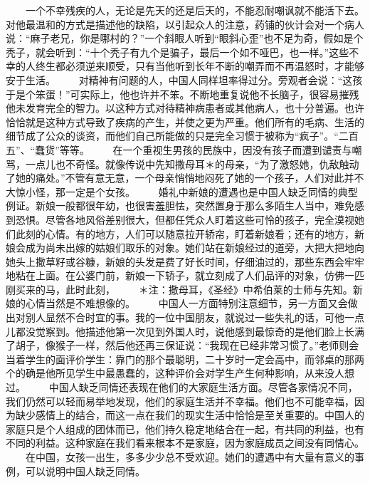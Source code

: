 \documentclass[12pt,oneside]{book}
\begin{document}
\begin{common-format}
　　一个不幸残疾的人，无论是先天的还是后天的，不能忍耐嘲讽就不能活下去。对他最温和的方式是描述他的缺陷，以引起众人的注意，药铺的伙计会对一个病人说：“麻子老兄，你是哪村的？”一个斜眼人听到“眼斜心歪”也不足为奇，假如是个秃子，就会听到：“十个秃子有九个是骗子，最后一个如不哑巴，也一样。”这些不幸的人终生都必须逆来顺受，只有当他听到长年不断的嘲弄而不再温怒时，才能够安于生活。 
　　对精神有问题的人，中国人同样坦率得过分。旁观者会说：“这孩于是个笨蛋！”可实际上，他也许并不笨。不断地重复说他不长脑子，很容易摧残他未发育完全的智力。以这种方式对待精神病患者或其他病人，也十分普遍。也许恰恰就是这种方式导致了疾病的产生，并使之更为严重。他们所有的毛病、生活的细节成了公众的谈资，而他们自己所能做的只是完全习惯于被称为“疯子”。“二百五”、“蠢货”等等。 
　　在一个重视生男孩的民族中，因没有孩子而遭到谴责与嘲骂，一点儿也不奇怪。就像传说中先知撒母耳＊的母亲，“为了激怒她，仇敌触动了她的痛处。”不管有意无意，一个母亲悄悄地闷死了她的一个孩子，人们对此并不大惊小怪，那一定是个女孩。 
　　婚礼中新娘的遭遇也是中国人缺乏同情的典型例证。新娘一般都很年幼，也很害羞胆怯，突然置身于那么多陌生人当中，难免感到恐惧。尽管各地风俗差别很大，但都任凭众人盯着这些可怜的孩子，完全漠视她们此刻的心情。有的地方，人们可以随意拉开轿帘，盯着新娘看；还有的地方，新娘会成为尚未出嫁的姑娘们取乐的对象。她们站在新娘经过的道旁，大把大把地向她头上撒草籽或谷糠，新娘的头发是费了好长时间，仔细油过的，那些东西会牢牢地粘在上面。在公婆门前，新娘一下轿子，就立刻成了人们品评的对象，仿佛一匹刚买来的马，此时此刻， 
　　＊注：撒母耳，《圣经》中希伯莱的士师与先知。新娘的心情当然是不难想像的。 
　　中国人一方面特别注意细节，另一方面又会做出对别人显然不合时宜的事。我的一位中国朋友，就说过一些失礼的话，可他一点儿都没觉察到。他描述他第一次见到外国人时，说他感到最惊奇的是他们脸上长满了胡子，像猴子一样，然后他还再三保证说：“我现在已经非常习惯了。”老师则会当着学生的面评价学生：靠门的那个最聪明，二十岁时一定会高中，而邻桌的那两个的确是他所见学生中最愚蠢的，这种评价会对学生产生何种影响，从来没人想过。 
　　中国人缺乏同情还表现在他们的大家庭生活方面。尽管各家情况不同，我们仍然可以轻而易举地发现，他们的家庭生活并不幸福。他们也不可能幸福，因为缺少感情上的结合，而这一点在我们的现实生活中恰恰是至关重要的。中国人的家庭只是个人组成的团体而已，他们持久稳定地结合在一起，有共同的利益，也有不同的利益。这种家庭在我们看来根本不是家庭，因为家庭成员之间没有同情心。 
　　在中国，女孩一出生，多多少少总不受欢迎。她们的遭遇中有大量有意义的事例，可以说明中国人缺乏同情。 

\end{common-format}
\end{document}
